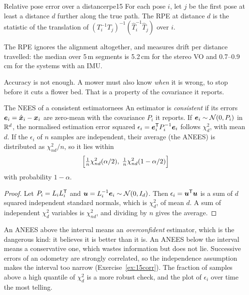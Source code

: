 \begin{definition}{Relative pose error over a distance}{rpe15}
For each pose $i$, let $j$ be the first pose at least a distance $d$
further along the true path. The RPE at distance $d$ is the statistic
of the translation of $(T_i^{-1}T_j)^{-1}(\hat T_i^{-1}\hat T_j)$ over $i$.
\end{definition}

The RPE ignores the alignment altogether, and measures drift per
distance travelled: the median over 5\,m segments is 5.2\,cm for the
stereo VO and 0.7--0.9\,cm for the systems with an IMU.

Accuracy is not enough. A mower must also know \emph{when} it is wrong,
to stop before it cuts a flower bed. That is a property of the
covariance it reports.

\begin{proposition}{The NEES of a consistent estimator}{nees}
An estimator is \emph{consistent} if its errors $\bm{e}_i=\hat{\bm{x}}_i-
\bm{x}_i$ are zero-mean with the covariance $P_i$ it reports. If
$\bm{e}_i\sim\mathcal{N}(0,P_i)$ in $\mathbb{R}^d$, the normalised estimation error
squared $\epsilon_i=\bm{e}_i^{\mathsf{T}} P_i^{-1}\bm{e}_i$ follows $\chi^2_d$,
with mean $d$. If the $\epsilon_i$ of $n$ samples are independent, their
average (the ANEES) is distributed as $\chi^2_{nd}/n$, so it lies within
\[
\Bigl[\tfrac1n\chi^2_{nd}(\alpha/2),\;\tfrac1n\chi^2_{nd}(1-\alpha/2)\Bigr]
\]
with probability $1-\alpha$.
\end{proposition}

\begin{proof}
Let $P_i=L_iL_i^{\mathsf{T}}$ and $\bm{u}=L_i^{-1}\bm{e}_i\sim\mathcal{N}(0,I_d)$.
Then $\epsilon_i=\bm{u}^{\mathsf{T}}\bm{u}$ is a sum of $d$ squared independent
standard normals, which is $\chi^2_d$, of mean $d$. A sum of independent
$\chi^2_d$ variables is $\chi^2_{nd}$, and dividing by $n$ gives the
average.
\end{proof}

An ANEES above the interval means an \emph{overconfident} estimator, which
is the dangerous kind: it believes it is better than it is. An ANEES
below the interval means a conservative one, which wastes information
but does not lie. Successive errors of an odometry are strongly
correlated, so the independence assumption makes the interval too
narrow (Exercise~\ref{ex:15corr}). The fraction of samples above a high
quantile of $\chi^2_d$ is a more robust check, and the plot of
$\epsilon_i$ over time the most telling.

